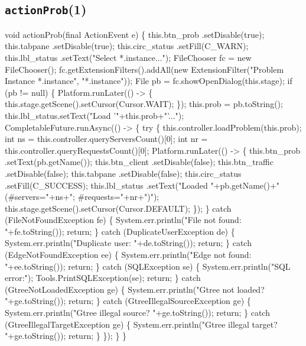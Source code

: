 \subsection{\texttt{actionProb}(1)}
\nwenddocs{}\endmoddef{}
void actionProb(final ActionEvent e) \{
  this.btn_prob     .setDisable(true);
  this.tabpane      .setDisable(true);
  this.circ_status  .setFill(C_WARN);
  this.lbl_status   .setText("Select *.instance...");
  FileChooser fc = new FileChooser();
  fc.getExtensionFilters().addAll(new ExtensionFilter("Problem Instance *.instance", "*.instance"));
  File pb = fc.showOpenDialog(this.stage);
  if (pb != null) \{
    Platform.runLater(() -> \{
      this.stage.getScene().setCursor(Cursor.WAIT);
    \});
    this.prob = pb.toString();
    this.lbl_status.setText("Load '"+this.prob+"'...");
    CompletableFuture.runAsync(() -> \{
      try \{
        this.controller.loadProblem(this.prob);
        int ns = this.controller.queryServersCount()[0];
        int nr = this.controller.queryRequestsCount()[0];
        Platform.runLater(() -> \{
          this.btn_prob     .setText(pb.getName());
          this.btn_client   .setDisable(false);
          this.btn_traffic  .setDisable(false);
          this.tabpane      .setDisable(false);
          this.circ_status  .setFill(C_SUCCESS);
          this.lbl_status   .setText("Loaded "+pb.getName()+"(#servers="+ns+"; #requests="+nr+")");
          this.stage.getScene().setCursor(Cursor.DEFAULT);
        \});
      \} catch (FileNotFoundException fe) \{
        System.err.println("File not found: "+fe.toString());
        return;
      \} catch (DuplicateUserException de) \{
        System.err.println("Duplicate user: "+de.toString());
        return;
      \} catch (EdgeNotFoundException ee) \{
        System.err.println("Edge not found: "+ee.toString());
        return;
      \} catch (SQLException se) \{
        System.err.println("SQL error:");
        Tools.PrintSQLException(se);
        return;
      \} catch (GtreeNotLoadedException ge) \{
        System.err.println("Gtree not loaded? "+ge.toString());
        return;
      \} catch (GtreeIllegalSourceException ge) \{
        System.err.println("Gtree illegal source? "+ge.toString());
        return;
      \} catch (GtreeIllegalTargetException ge) \{
        System.err.println("Gtree illegal target? "+ge.toString());
        return;
      \}
    \});
  \}
\}
\nwendcode{}\nwdocspar

